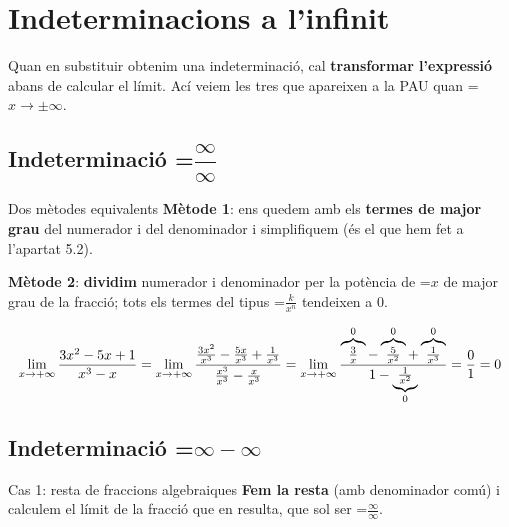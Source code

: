 \documentclass[11pt,a4paper]{article}
\newcommand{\fmm}[1]{\setbox0=\hbox{$#1$}\ifdim\wd0>\linewidth\fmdisp{#1}\else\mbox{\box0}\fi}
\newcommand{\fmdisp}[1]{\[\setbox2=\hbox{$\displaystyle #1$}\ifdim\wd2>\linewidth\resizebox{\linewidth}{!}{\box2}\else\box2\fi\]}
\begin{document}
\section{Indeterminacions a l'infinit}\hypertarget{sec4}{}

Quan en substituir obtenim una indeterminació, cal \textbf{transformar l'expressió} abans de calcular el límit. Ací veiem les tres que apareixen a la PAU quan \fmm{x\to\pm\infty}.

\subsection*{Indeterminació \fmm{\dfrac{\infty}{\infty}}}

\begin{fmdef}{Dos mètodes equivalents}
\textbf{Mètode 1}: ens quedem amb els \textbf{termes de major grau} del numerador i del denominador i simplifiquem (és el que hem fet a l'apartat 5.2).

\textbf{Mètode 2}: \textbf{dividim} numerador i denominador per la potència de \fmm{x} de major grau de la fracció; tots els termes del tipus \fmm{\frac{k}{x^n}} tendeixen a 0.

\fmdisp{\lim_{x\to+\infty}\frac{3x^2-5x+1}{x^3-x}=\lim_{x\to+\infty}\frac{\frac{3x^2}{x^3}-\frac{5x}{x^3}+\frac{1}{x^3}}{\frac{x^3}{x^3}-\frac{x}{x^3}}=\lim_{x\to+\infty}\frac{\overbrace{\tfrac{3}{x}}^{0}-\overbrace{\tfrac{5}{x^2}}^{0}+\overbrace{\tfrac{1}{x^3}}^{0}}{1-\underbrace{\tfrac{1}{x^2}}_{0}}=\frac01=0}

\end{fmdef}

\subsection*{Indeterminació \fmm{\infty-\infty}}

\begin{fmdef}{Cas 1: resta de fraccions algebraiques}
\textbf{Fem la resta} (amb denominador comú) i calculem el límit de la fracció que en resulta, que sol ser \fmm{\frac{\infty}{\infty}}.
\end{fmdef}
\end{document}
